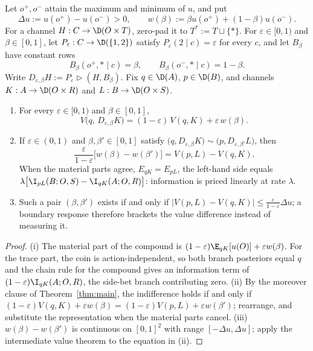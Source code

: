 \begin{proposition}
\label{prop:wtp}\label{def:dilution}
Let $o^+,o^-$ attain the maximum and minimum of $u$, and put
\[
 \Delta u:=u(o^+)-u(o^-)>0,
 \qquad
 w(\beta):=\beta u(o^+)+(1-\beta)u(o^-).
\]
For a channel $H:C\to\D(O\times T)$, zero-pad it to
$T^\ast:=T\sqcup\{\ast\}$.  For $\varepsilon\in[0,1)$ and
$\beta\in[0,1]$, let $P_\varepsilon:C\to\D(\{1,2\})$ satisfy
$P_\varepsilon(2\mid c)=\varepsilon$ for every $c$, and let $B_\beta$ have
constant rows
\[
 B_\beta(o^+,\ast\mid c)=\beta,
 \qquad B_\beta(o^-,\ast\mid c)=1-\beta.
\]
Write
$D_{\varepsilon,\beta}H:=P_\varepsilon\triangleright(H,B_\beta)$.
Fix $q\in\D(A)$, $p\in\D(B)$, and channels $K:A\to\D(O\times R)$ and $L:B\to\D(O\times S)$.
\begin{enumerate}[label=\textup{(\roman*)},leftmargin=*]
\item For every $\varepsilon\in[0,1)$ and $\beta\in[0,1]$,
\[
 V\bigl(q,\,D_{\varepsilon,\beta}K\bigr)=(1-\varepsilon)\,V(q,K)+\varepsilon\,w(\beta).
\]
\item If $\varepsilon\in(0,1)$ and $\beta,\beta'\in[0,1]$ satisfy
$\bigl(q,D_{\varepsilon,\beta}K\bigr)\sim\bigl(p,D_{\varepsilon,\beta'}L\bigr)$, then
\[
 \frac{\varepsilon}{1-\varepsilon}\bigl[w(\beta)-w(\beta')\bigr]
 =V(p,L)-V(q,K).
\]
When the material parts agree, $E_{qK}=E_{pL}$, the left-hand side equals
$\lambda\bigl[\I_{pL}(B;O,S)-\I_{qK}(A;O,R)\bigr]$: information is priced linearly at rate $\lambda$.
\item Such a pair $(\beta,\beta')$ exists if and only if
$\lvert V(p,L)-V(q,K)\rvert\le\frac{\varepsilon}{1-\varepsilon}\Delta u$; a boundary response therefore brackets
the value difference instead of measuring it.
\end{enumerate}
\end{proposition}

\begin{proof}
(i) The material part of the compound is $(1-\varepsilon)\E_{qK}[u(O)]+\varepsilon w(\beta)$.  For the trace part,
the coin is action-independent, so both branch posteriors equal $q$ and the chain rule for the compound gives an
information term of $(1-\varepsilon)\I_{qK}(A;O,R)$, the side-bet branch contributing zero.
(ii) By the moreover clause of Theorem~\ref{thm:main}, the indifference holds if and only if
$(1-\varepsilon)V(q,K)+\varepsilon w(\beta)=(1-\varepsilon)V(p,L)+\varepsilon w(\beta')$; rearrange, and
substitute the representation when the material parts cancel.
(iii) $w(\beta)-w(\beta')$ is continuous on $[0,1]^2$ with range $[-\Delta u,\Delta u]$; apply the intermediate
value theorem to the equation in \textup{(ii)}.
\end{proof}

